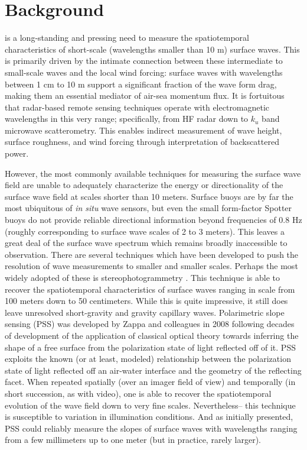 \documentclass[letterpaper,journal]{IEEEtran}
\begin{document}
\IEEEpeerreviewmaketitle

\section{Background}
\label{sec:intro}
 is a long-standing and pressing need to measure the spatiotemporal characteristics of short-scale (wavelengths smaller than 10 m) surface waves. This is primarily driven by the intimate connection between these intermediate to small-scale waves and the local wind forcing: surface waves with wavelengths between 1 cm to 10 m support a significant fraction of the wave form drag, making them an essential mediator of air-sea momentum flux. It is fortuitous that radar-based remote sensing techniques operate with electromagnetic wavelengths in this very range; specifically, from HF radar down to $k_u$ band microwave scatterometry. This enables indirect measurement of wave height, surface roughness, and wind forcing through interpretation of backscattered power.

However, the most commonly available techniques for measuring the surface wave field are unable to adequately characterize the energy or directionality of the surface wave field at scales shorter than 10 meters. Surface buoys are by far the most ubiquitous of \emph{in situ} wave sensors, but even the small form-factor Spotter buoys do not provide reliable directional information beyond frequencies of 0.8 Hz (roughly corresponding to surface wave scales of 2 to 3 meters). This leaves a great deal of the surface wave spectrum which remains broadly inaccessible to observation. There are several techniques which have been developed to push the resolution of wave measurements to smaller and smaller scales. Perhaps the most widely adopted of these is stereophotogrammetry \cite{Benetazzo2006,bergamasco_wass_2017}. This technique is able to recover the spatiotemporal characteristics of surface waves ranging in scale from 100 meters down to 50 centimeters. While this is quite impressive, it still does leave unresolved short-gravity and gravity capillary waves. Polarimetric slope sensing (PSS) was developed by Zappa and colleagues in 2008 \cite{Zappa2008} following decades of development of the application of classical optical theory towards inferring the shape of a free surface from the polarization state of light reflected off of it. PSS exploits the known (or at least, modeled) relationship between the polarization state of light reflected off an air-water interface and the geometry of the reflecting facet. When repeated spatially (over an imager field of view) and temporally (in short succession, as with video), one is able to recover the spatiotemporal evolution of the wave field down to very fine scales. Nevertheless-- this technique is susceptible to variation in illumination conditions. And as initially presented, PSS could reliably measure the slopes of surface waves with wavelengths ranging from a few millimeters up to one meter (but in practice, rarely larger).
\end{document}
